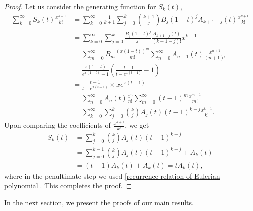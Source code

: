 \documentclass[11pt,reqno]{amsart}
\renewcommand{\(}{\left\(}
\renewcommand{\)}{\right\)}
\renewcommand{\[}{\left\[}
\renewcommand{\]}{\right\]}
\numberwithin{equation}{section}
\theoremstyle{plain}
\begin{document}
\begin{proof}
 Let us consider the generating function for $S_k(t)$,  
{\allowdisplaybreaks
\begin{align*}
\sum_{k=0}^\infty S_k(t) \frac{x^{k+1}}{k!} &= \sum_{k=0}^\infty \frac{1}{k+1}\sum_{j=0}^k {k+1 \choose j} B_j(1-t)^j A_{k+1-j}(t) \frac{x^{k+1}}{k!}\\
&= \sum_{k=0}^\infty \sum_{j=0}^k \frac{B_j (1-t)^j}{j!} \frac{A_{k+1-j}(t)}{(k+1-j)!} x^{k+1}\\
&= \sum_{m=0}^\infty B_m \frac{(x(1-t))^m}{m!} \sum_{n=0}^\infty A_{n+1}(t) \frac{x^{n+1}}{(n+1)!}\\
&=\frac{x(1-t)}{e^{x(1-t)}-1} \left( \frac{t-1}{t-e^{x(t-1)}}-1 \right)\\
&=\frac{t-1}{t-e^{x(t-1)}} \times xe^{x(t-1)}\\
&=\sum_{n=0}^\infty A_n(t) \frac{x^n}{n!} \sum_{m=0}^\infty (t-1)^m \frac{x^{m+1}}{m!}\\
&=\sum_{k=0}^\infty \sum_{j=0}^k {k \choose j} A_j(t)(t-1)^{k-j} \frac{x^{k+1}}{k!}.
\end{align*}}
Upon comparing the coefficients of $\frac{x^{k+1}}{k!}$, we get
\begin{align*}
S_k(t)&=\sum_{j=0}^k {k \choose j} A_j(t)(t-1)^{k-j}\\
&=\sum_{j=0}^{k-1} {k \choose j} A_j(t)(t-1)^{k-j} + A_k(t)\\
&=(t-1)A_k(t)+A_k(t)=tA_k(t),
\end{align*}
where in the penultimate step we used \eqref{recurrence relation of Eulerian polynomial}.  This completes the proof.  
\end{proof}
In the next section,  we present the proofs of our main results.  
\end{document}
